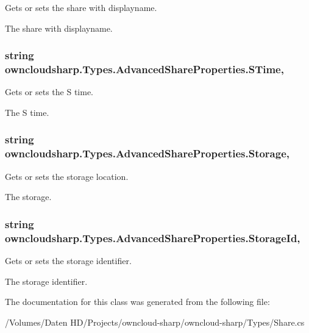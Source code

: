 Gets or sets the share with displayname. 

The share with displayname.\hypertarget{classowncloudsharp_1_1_types_1_1_advanced_share_properties_ac0b2869e60caefc6e067b04dff2d406a}{}
\subsubsection[{S\+Time}]{\setlength{\rightskip}{0pt plus 5cm}string owncloudsharp.\+Types.\+Advanced\+Share\+Properties.\+S\+Time\hspace{0.3cm}{\ttfamily [get]}, {\ttfamily [set]}}\label{classowncloudsharp_1_1_types_1_1_advanced_share_properties_ac0b2869e60caefc6e067b04dff2d406a}


Gets or sets the S time. 

The S time.\hypertarget{classowncloudsharp_1_1_types_1_1_advanced_share_properties_adab4924c763e36e0e856d28b74d5a579}{}
\subsubsection[{Storage}]{\setlength{\rightskip}{0pt plus 5cm}string owncloudsharp.\+Types.\+Advanced\+Share\+Properties.\+Storage\hspace{0.3cm}{\ttfamily [get]}, {\ttfamily [set]}}\label{classowncloudsharp_1_1_types_1_1_advanced_share_properties_adab4924c763e36e0e856d28b74d5a579}


Gets or sets the storage location. 

The storage.\hypertarget{classowncloudsharp_1_1_types_1_1_advanced_share_properties_a293f3ebc8934e70f5a52b08ebe51236a}{}
\subsubsection[{Storage\+Id}]{\setlength{\rightskip}{0pt plus 5cm}string owncloudsharp.\+Types.\+Advanced\+Share\+Properties.\+Storage\+Id\hspace{0.3cm}{\ttfamily [get]}, {\ttfamily [set]}}\label{classowncloudsharp_1_1_types_1_1_advanced_share_properties_a293f3ebc8934e70f5a52b08ebe51236a}


Gets or sets the storage identifier. 

The storage identifier.

The documentation for this class was generated from the following file\+:\begin{DoxyCompactItemize}
\item 
/\+Volumes/\+Daten H\+D/\+Projects/owncloud-\/sharp/owncloud-\/sharp/\+Types/Share.\+cs\end{DoxyCompactItemize}
